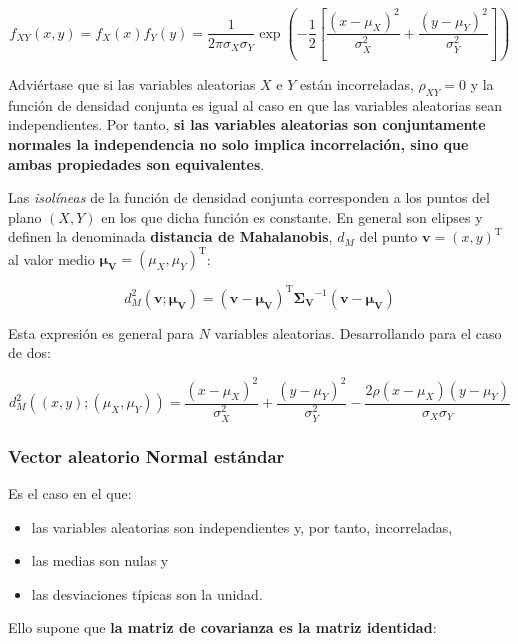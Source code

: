 \documentclass[11pt]{article}
\providecommand{\tightlist}{%
      \setlength{\itemsep}{0pt}\setlength{\parskip}{0pt}}
\begin{document}
\[
f_{XY}(x, y)=f_{X}(x)f_{Y}(y) = \frac{1}{2 \pi \sigma_{X} \sigma_{Y}} \exp \left(-\frac{1}{2}\left[\frac{\left(x-\mu_{X}\right)^{2}}{\sigma_{X}^{2}}+\frac{\left(y-\mu_{Y}\right)^{2}}{\sigma_{Y}^{2}}\right]\right)
\]

Adviértase que si las variables aleatorias \(X\) e \(Y\) están
incorreladas, \(\rho_{XY}=0\) y la función de densidad conjunta es igual
al caso en que las variables aleatorias sean independientes. Por tanto,
\textbf{si las variables aleatorias son conjuntamente normales la
independencia no solo implica incorrelación, sino que ambas propiedades
son equivalentes}.

    Las \emph{isolíneas} de la función de densidad conjunta corresponden a
los puntos del plano \((X,Y)\) en los que dicha función es constante. En
general son elipses y definen la denominada \textbf{distancia de
Mahalanobis}, \(d_M\) del punto \(\mathbf{v}=(x,y)^\mathrm{T}\) al valor
medio \(\boldsymbol{\mu_V}=(\mu_X,\mu_Y)^\mathrm{T}\):

\[
d_M^2(\mathbf{v};\boldsymbol{\mu_V})=(\mathbf{v}-\boldsymbol{\mu_V})^{\mathrm{T}} \boldsymbol{\Sigma_V}^{-1}(\mathbf{v}-\boldsymbol{\mu_V})
\]

Esta expresión es general para \(N\) variables aleatorias. Desarrollando
para el caso de dos:

\[
d_M^2\left((x,y);(\mu_X,\mu_Y)\right) = \frac{\left(x-\mu_{X}\right)^{2}}{\sigma_{X}^{2}}+\frac{\left(y-\mu_{Y}\right)^{2}}{\sigma_{Y}^{2}}-\frac{2 \rho\left(x-\mu_{X}\right)\left(y-\mu_{Y}\right)}{\sigma_{X} \sigma_{Y}}
\]

    \hypertarget{vector-aleatorio-normal-estuxe1ndar}{%
\subsubsection{Vector aleatorio Normal
estándar}\label{vector-aleatorio-normal-estuxe1ndar}}

Es el caso en el que:

\begin{itemize}
\tightlist
\item
  las variables aleatorias son independientes y, por tanto,
  incorreladas,
\item
  las medias son nulas y
\item
  las desviaciones típicas son la unidad.
\end{itemize}

Ello supone que \textbf{la matriz de covarianza es la matriz identidad}:
\end{document}

